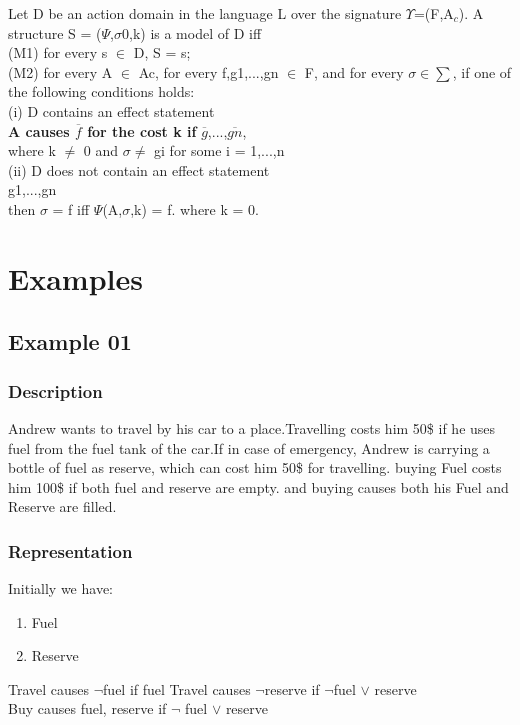 \documentclass[11pt]{article}
\begin{document}
Let D be an action domain in the language L over the signature $\Upsilon$=(F,A$_{c}$). A structure S = ($\Psi$,$\sigma$0,k) is a model of D iff\\
(M1) for every s $\in$ D, S \textbar= s;\\
(M2) for every A $\in$ Ac, for every f,g1,...,gn $\in$ F, and for every $\sigma\in\sum$, if one of the following conditions holds:
\\\indent
(i) D contains an effect statement\\
\indent\indent 
{\bfseries A causes $\overline{f}$ for the cost k if} $\overline{g}$,...,$\overline{gn}$,\\
\indent where k $\neq$ 0 and $\sigma$\textbar$\neq$  gi for some i = 1,...,n\\
\indent(ii) D does not contain an effect statement\\
\indent{} g1,...,gn\\
\indent then $\sigma$ \textbar= f iff $\Psi$(A,$\sigma$,k) \textbar= f. where k = 0.\\

	\section{Examples}\label{sec:Examples}
	\subsection{Example 01}\label{example:ex01}
	\subsubsection{Description}\label{par:p101}
	Andrew wants to travel by his car to a place.Travelling costs him 50\$ if he uses fuel from the fuel tank of the car.If in case of emergency, Andrew is carrying a bottle of fuel as reserve, which can cost him 50\$ for travelling. buying Fuel costs him 100\$ if both fuel and reserve are empty. and buying causes both his Fuel and Reserve are filled. 
	\subsubsection{Representation}\label{par:p201}
	Initially we have:
	\begin{enumerate}
		\item Fuel
		\item Reserve
	\end{enumerate}
	Travel causes $\neg$fuel if fuel %
	Travel causes $\neg$reserve if $\neg$fuel $\vee$ reserve\\
	Buy causes fuel, reserve  if $\neg$ fuel $\vee$ reserve\\
\end{document}
